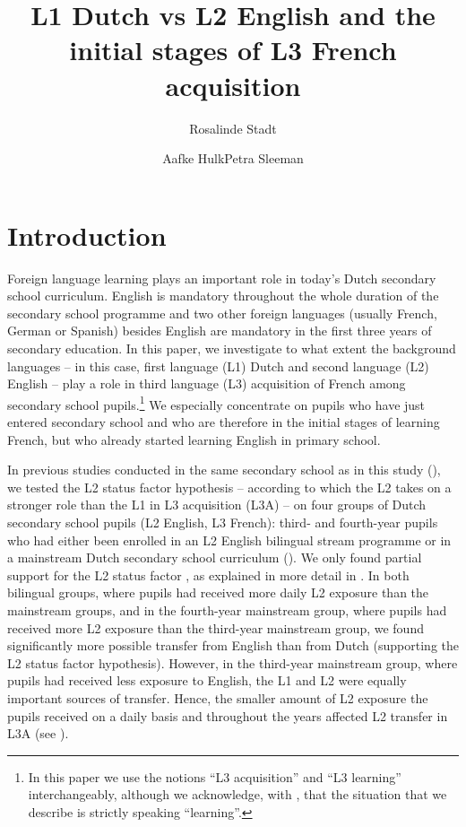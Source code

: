 \documentclass[output=paper]{langsci/langscibook}
\author{Rosalinde Stadt\affiliation{University of Amsterdam}\and Aafke Hulk\affiliation{University of Amsterdam}\lastand Petra Sleeman\affiliation{University of Amsterdam}}
\title{L1 Dutch vs L2 English and the initial stages of L3 French acquisition}
\begin{document}
\maketitle
\section{Introduction}%
\label{sec:stadt:1}

Foreign language learning plays an important role in today's Dutch secondary school curriculum. English is mandatory throughout the whole duration of the secondary school programme and two other foreign languages (usually French, German or Spanish) besides English are mandatory in the first three years of secondary education. In this paper, we investigate to what extent the background languages – in this case, first language (L1) Dutch and second language (L2) English – play a role in third language (L3) acquisition of French among secondary school pupils.\footnote{In this paper we use the notions ``L3 acquisition'' and ``L3 learning'' interchangeably, although we acknowledge, with \citet[fn 1, p.61]{BardelFalk2012}, that the situation that we describe is strictly speaking ``learning''.} We especially concentrate on pupils who have just entered secondary school and who are therefore in the initial stages of learning French, but who already started learning English in primary school.

In previous studies conducted in the same secondary school as in this study (\citealt{StadtEtAl2016, StadtEtAl2018Exposure}), we tested the L2 status factor hypothesis – according to which the L2 takes on a stronger role than the L1 in L3 acquisition (L3A) – on four groups of Dutch secondary school pupils (L2 English, L3 French): third- and fourth-year pupils who had either been enrolled in an L2 English bilingual stream programme or in a mainstream Dutch secondary school curriculum (\citealt{StadtEtAl2016, StadtEtAl2018Exposure}). We only found partial support for the L2 status factor \citep{BardelFalk2007, FalkBardel2011}, as explained in more detail in . In both bilingual groups, where pupils had received more daily L2 exposure than the mainstream groups, and in the fourth-year mainstream group, where pupils had received more L2 exposure than the third-year mainstream group, we found significantly more possible transfer from English than from Dutch (supporting the L2 status factor hypothesis). However, in the third-year mainstream group, where pupils had received less exposure to English, the L1 and L2 were equally important sources of transfer. Hence, the smaller amount of L2 exposure the pupils received on a daily basis and throughout the years affected L2 transfer in L3A (see \citealt{Hammarberg2001, Hammarberg2009, Tremblay2006}).
\end{document}
